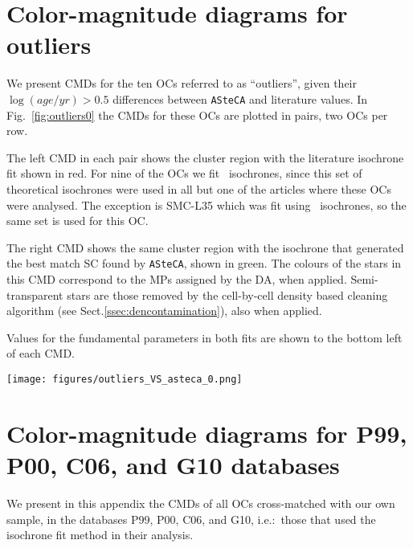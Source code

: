 \documentclass[a4paper,fleqn,usenatbib]{mnras}
\begin{document}

\appendix

\section{Color-magnitude diagrams for outliers}
\label{apdx:outliers}

We present CMDs for the ten OCs referred to as ``outliers'', given their
$\log(age/yr)>0.5$ differences between \texttt{ASteCA} and literature values.
In Fig.~\ref{fig:outliers0} the CMDs for these OCs are plotted in pairs, two OCs
per row.

The left CMD in each pair shows the cluster region with the literature isochrone
fit shown in red. For nine of the OCs we fit~\cite{Marigo_2008} isochrones,
since this set of theoretical isochrones were used in all but one of the
articles where these OCs were analysed. The exception is SMC-L35 which was fit
using~\cite{Girardi_2002} isochrones, so the same set is used for this OC.\@

The right CMD shows the same cluster region with the isochrone
that generated the best match SC found by \texttt{ASteCA}, shown in green.
The colours of the stars in this CMD correspond to the MPs assigned by the DA,
when applied.
Semi-transparent stars are those removed by the cell-by-cell density based
cleaning algorithm  (see Sect.\ref{ssec:dencontamination}), also when applied.

Values for the fundamental parameters in both fits are shown to the bottom left
of each CMD.\@

\begin{figure*}
\texttt{[image: figures/outliers\_VS\_asteca\_0.png]}
\caption{CMDs for the outliers set. See description of the plots in
Appendix~\ref{apdx:outliers}.}
\label{fig:outliers0}
\end{figure*}





\section{Color-magnitude diagrams for P99, P00, C06, and G10 databases}
\label{apdx:databases}

We present in this appendix the CMDs of all OCs cross-matched with our own
sample, in the databases P99, P00, C06, and G10, i.e.:\ those that used the
isochrone fit method in their analysis.
\end{document}
